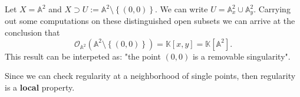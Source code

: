 \begin{ex}
	Let $X = \mathbb{A}^{2}$ and $X \supset U := \mathbb{A}^{2} \setminus \left\{ \left( 0,0 \right) \right\}$.
	We can write $U = \mathbb{A}_x^2 \cup \mathbb{A}_y^2$.
	Carrying out some computations on these distinguished open subsets we can arrive at the conclusion that
	\begin{equation}
	\mathcal{O}_{\mathbb{A}^{2}} \left( \mathbb{A}^{2} \setminus \left\{ \left(0, 0\right) \right\} \right) =
	\mathbb{K}[x,y] = \mathbb{K}[\mathbb{A}^{2}]
	.\end{equation} 
	This result can be interpeted as:
	"the point $\left(0, 0\right)$ is a removable singularity".
\end{ex} 

\begin{rem}
	Since we can check regularity at a neighborhood of single points, then regularity is a \textbf{local} property.
\end{rem}

